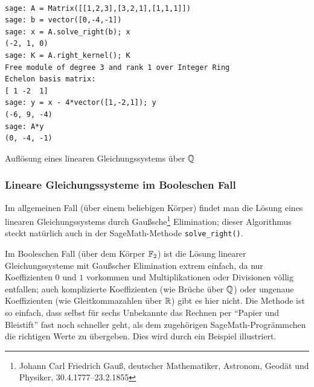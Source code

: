 \begin{refsegment}
\begin{sagecode}
\begin{verbatim}

sage: A = Matrix([[1,2,3],[3,2,1],[1,1,1]])
sage: b = vector([0,-4,-1])
sage: x = A.solve_right(b); x
(-2, 1, 0)
sage: K = A.right_kernel(); K
Free module of degree 3 and rank 1 over Integer Ring
Echelon basis matrix:
[ 1 -2  1]
sage: y = x - 4*vector([1,-2,1]); y
(-6, 9, -4)
sage: A*y
(0, -4, -1)
\end{verbatim}
\caption{Auflösung eines linearen
  Gleichungssystems
  über $\mathbb{Q}$}
\label{Sage-code-bool-lin-equ-Q}
\end{sagecode}

\subsubsection*{Lineare Gleichungssysteme im Booleschen Fall}

Im allgemeinen Fall (über einem beliebigen Körper) findet man die
Lösung eines linearen Gleichungssystems
durch Gaußsche\footnote{%
  Johann Carl Friedrich Gauß,
  deutscher Mathematiker, Astronom, Geodät und Physiker, 30.4.1777--23.2.1855
} Elimination; dieser Algorithmus steckt natürlich auch in
der SageMath-Methode {\tt solve\_right()}.

Im Booleschen Fall (über dem Körper $\mathbb{F}_2$) ist die Lösung
linearer
Gleichungssysteme mit Gaußscher Elimination extrem einfach, da nur
Koeffizienten $0$ und $1$ vorkommen und Multiplikationen oder
Divisionen völlig entfallen; auch komplizierte Koeffizienten (wie
Brüche über $\mathbb{Q}$) oder ungenaue Koeffizienten (wie Gleitkommazahlen über
$\mathbb{R}$) gibt es hier nicht. Die Methode ist so einfach, dass selbst für sechs
Unbekannte das Rechnen per "`Papier und Bleistift"' fast noch schneller
geht, als dem zugehörigen SageMath-Progrämmchen die richtigen Werte zu
übergeben. Dies wird durch ein Beispiel illustriert.


\end{refsegment}
